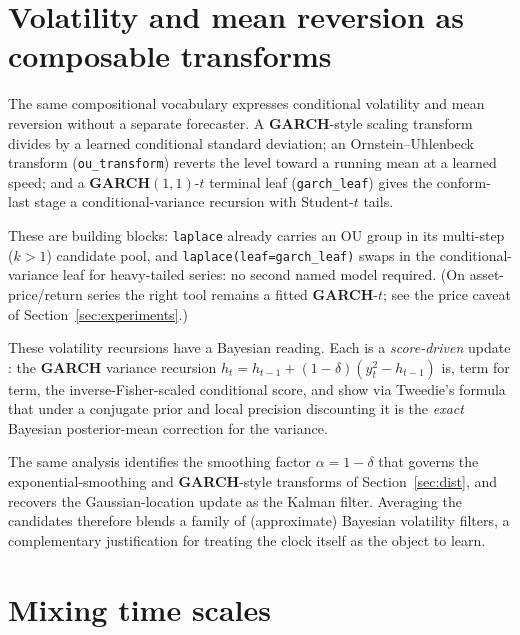\documentclass[article]{jss}
\providecommand{\pkg}[1]{\textbf{#1}}
\providecommand{\code}[1]{\texttt{#1}}
\begin{document}
\section{Volatility and mean reversion as composable transforms} \label{sec:doob}

The same compositional vocabulary expresses conditional volatility and mean
reversion without a separate forecaster. A \pkg{GARCH}-style scaling transform
divides by a learned conditional standard deviation; an Ornstein--Uhlenbeck
transform (\code{ou\_transform}) reverts the level toward a running mean at a
learned speed; and a \pkg{GARCH}$(1,1)$-$t$ terminal leaf (\code{garch\_leaf})
gives the conform-last stage a conditional-variance recursion with Student-$t$
tails.

These are building blocks: \code{laplace} already carries an OU group in
its multi-step ($k>1$) candidate pool, and \code{laplace(leaf=garch\_leaf)} swaps
in the conditional-variance leaf for heavy-tailed series: no second named model
required. (On asset-price/return series the right tool remains a fitted
\pkg{GARCH}-$t$; see the price caveat of Section~\ref{sec:experiments}.)

These volatility recursions have a Bayesian reading. Each is a \emph{score-driven}
update \citep{creal2013generalized,harvey2013dynamic}: the \pkg{GARCH} variance
recursion $h_t = h_{t-1} + (1-\delta)(y_t^2 - h_{t-1})$ is, term for term, the
inverse-Fisher-scaled conditional score, and \citet{hansen2026tweedie} show via
Tweedie's formula that under a conjugate prior and local precision discounting it
is the \emph{exact} Bayesian posterior-mean correction for the variance.

The same
analysis identifies the smoothing factor $\alpha = 1-\delta$ that governs the
exponential-smoothing and \pkg{GARCH}-style transforms of
Section~\ref{sec:dist}, and recovers the Gaussian-location update as the Kalman
filter. Averaging the candidates therefore blends a family of (approximate)
Bayesian volatility filters, a complementary justification for treating the clock
itself as the object to learn.

\section{Mixing time scales} \label{sec:granularity}
\end{document}
